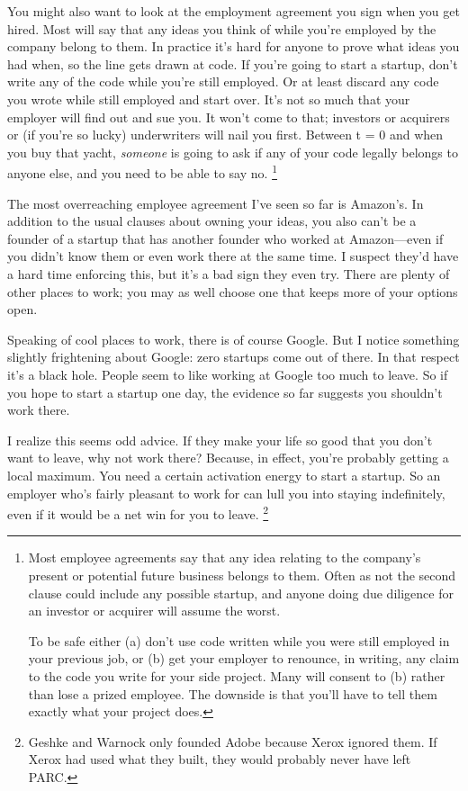 \documentclass[12pt]{book}
\begin{document}
You might also want to look at the employment agreement you sign when
you get hired. Most will say that any ideas you think of while you're
employed by the company belong to them. In practice it's hard for anyone
to prove what ideas you had when, so the line gets drawn at code. If
you're going to start a startup, don't write any of the code while
you're still employed. Or at least discard any code you wrote while
still employed and start over. It's not so much that your employer will
find out and sue you. It won't come to that; investors or acquirers or
(if you're so lucky) underwriters will nail you first. Between t = 0 and
when you buy that yacht, \emph{someone} is going to ask if any of your
code legally belongs to anyone else, and you need to be able to say no.
\footnote{Most employee agreements say that any idea relating to the
company's present or potential future business belongs to them. Often as
not the second clause could include any possible startup, and anyone
doing due diligence for an investor or acquirer will assume the worst.

To be safe either (a) don't use code written while you were still
employed in your previous job, or (b) get your employer to renounce, in
writing, any claim to the code you write for your side project. Many
will consent to (b) rather than lose a prized employee. The downside is
that you'll have to tell them exactly what your project does.}

The most overreaching employee agreement I've seen so far is Amazon's.
In addition to the usual clauses about owning your ideas, you also can't
be a founder of a startup that has another founder who worked at
Amazon---even if you didn't know them or even work there at the same
time. I suspect they'd have a hard time enforcing this, but it's a bad
sign they even try. There are plenty of other places to work; you may as
well choose one that keeps more of your options open.

Speaking of cool places to work, there is of course Google. But I notice
something slightly frightening about Google: zero startups come out of
there. In that respect it's a black hole. People seem to like working at
Google too much to leave. So if you hope to start a startup one day, the
evidence so far suggests you shouldn't work there.

I realize this seems odd advice. If they make your life so good that you
don't want to leave, why not work there? Because, in effect, you're
probably getting a local maximum. You need a certain activation energy
to start a startup. So an employer who's fairly pleasant to work for can
lull you into staying indefinitely, even if it would be a net win for
you to leave. \footnote{Geshke and Warnock only founded Adobe because Xerox ignored
them. If Xerox had used what they built, they would probably never have
left PARC.}
\end{document}
